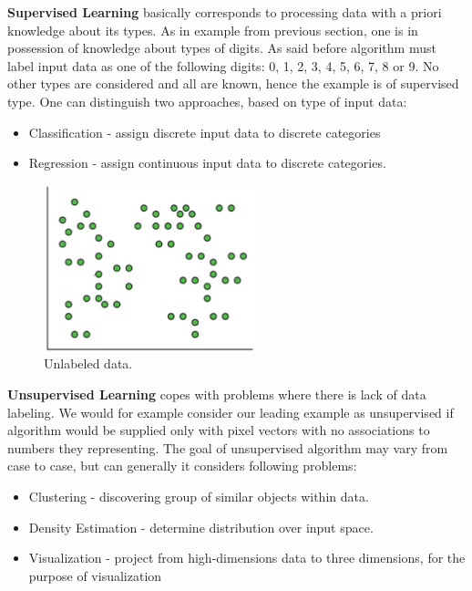 \documentclass{mini}
\begin{document}
\textbf{Supervised Learning} basically corresponds to processing data with a priori knowledge about its types. As in example from previous section, one is in possession of knowledge about types of digits. As said before algorithm must label input data as one of the following digits: 0, 1, 2, 3, 4, 5, 6, 7, 8 or 9. No other types are considered and all are known, hence the example is of supervised type. One can distinguish two approaches, based on type of input data:
\begin{itemize}
  \item Classification - assign discrete input data to discrete categories
  \item Regression - assign continuous input data to discrete categories.
\end{itemize}

\begin{figure}
  \begin{center}
    \includegraphics[width=0.55\textwidth]{images/unsupervised_graph.png}
  \end{center}
  \caption{Unlabeled data.}
  \label{fig:handwritten_ex}
\end{figure}

\textbf{Unsupervised Learning} copes with problems where there is lack of data labeling. We would for example consider our leading example as unsupervised if algorithm would be supplied only with pixel vectors with no associations to numbers they representing. The goal of unsupervised algorithm may vary from case to case, but can generally it considers following problems:

\begin{itemize}
  \item Clustering - discovering group of similar objects within data.
  \item Density Estimation - determine distribution over input space.
  \item Visualization - project from high-dimensions data to three dimensions, for the purpose of visualization
\end{itemize}
\end{document}
